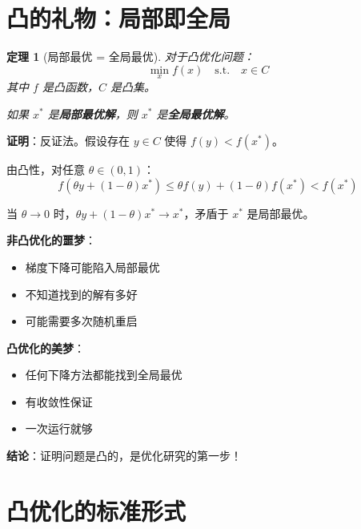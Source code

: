 \documentclass[12pt, a4paper]{ctexart}
\newtheorem{theorem}{定理}[section]
\begin{document}
\section{凸的礼物：局部即全局}

\begin{blackboard}[凸优化的核心定理]

\begin{theorem}[局部最优 = 全局最优]
对于凸优化问题：
\[
\min_x f(x) \quad \text{s.t.} \quad x \in C
\]
其中 $f$ 是凸函数，$C$ 是凸集。

如果 $x^*$ 是\textbf{局部最优解}，则 $x^*$ 是\textbf{全局最优解}。
\end{theorem}

\textbf{证明}：反证法。假设存在 $y \in C$ 使得 $f(y) < f(x^*)$。

由凸性，对任意 $\theta \in (0, 1)$：
\[
f(\theta y + (1-\theta) x^*) \leq \theta f(y) + (1-\theta) f(x^*) < f(x^*)
\]

当 $\theta \to 0$ 时，$\theta y + (1-\theta) x^* \to x^*$，矛盾于 $x^*$ 是局部最优。

\end{blackboard}

\begin{insight}[为什么这个定理如此重要？]

\textbf{非凸优化的噩梦}：
\begin{itemize}
    \item 梯度下降可能陷入局部最优
    \item 不知道找到的解有多好
    \item 可能需要多次随机重启
\end{itemize}

\textbf{凸优化的美梦}：
\begin{itemize}
    \item 任何下降方法都能找到全局最优
    \item 有收敛性保证
    \item 一次运行就够
\end{itemize}

\textbf{结论}：证明问题是凸的，是优化研究的第一步！

\end{insight}

\section{凸优化的标准形式}
\end{document}
